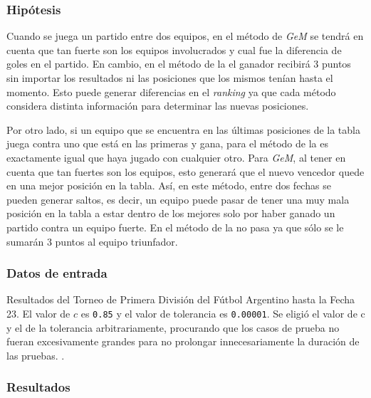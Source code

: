 			\subsubsection*{Hipótesis} 
			Cuando se juega un partido entre dos equipos, en el método de \emph{GeM} se tendrá en cuenta que tan fuerte son los equipos involucrados y cual fue la diferencia de goles en el partido. En cambio, en el método de la  el ganador recibirá 3 puntos sin importar los resultados ni las posiciones que los mismos tenían hasta el momento. Esto puede generar diferencias en el \emph{ranking} ya que cada método considera distinta información para determinar las nuevas posiciones. 
			
			Por otro lado, si un equipo que se encuentra en las últimas posiciones de la tabla juega contra uno que está en las primeras y gana, para el método de la  es exactamente igual que haya jugado con cualquier otro. Para \emph{GeM}, al tener en cuenta que tan fuertes son los equipos, esto generará que el nuevo vencedor quede en una mejor posición en la tabla. Así, en este método, entre dos fechas se pueden generar saltos, es decir, un equipo puede pasar de tener una muy mala posición en la tabla a estar dentro de los mejores solo por haber ganado un partido contra un equipo fuerte. En el método de la  no pasa ya que sólo se le sumarán 3 puntos al equipo triunfador.		

			\subsubsection*{Datos de entrada} 
				Resultados del Torneo de Primera División del Fútbol Argentino hasta la Fecha 23. El valor de $c$ es \texttt{0.85} y el valor de tolerancia es \texttt{0.00001}. Se eligió el valor de c y el de la tolerancia arbitrariamente, procurando que los casos de prueba no fueran excesivamente grandes para no prolongar innecesariamente la duración de las pruebas. 
. 

			\subsubsection*{Resultados}

